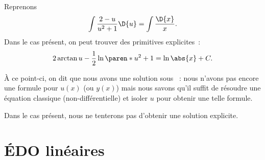 \begin{frame}
  \begin{example}
    Reprenons\pause{}
    \begin{equation*}
      \int \frac{2-u}{u^{2}+1}\D{u} = \int \frac{\D{x}}{x}.
    \end{equation*}\pause{}
    Dans le cas présent, on peut trouver des primitives explicites~:
    \begin{equation*}
      2 \arctan u - \frac{1}{2} \ln{\paren*{u^{2}+1}} = \ln\abs{x} + C.
    \end{equation*}\pause{}

    À ce point-ci, on dit que nous avons une solution sous ~:\pause{} nous n'avons pas encore une formule pour \(u(x)\) (ou \(y(x)\))\pause{} mais nous savons qu'il \og suffit\fg{} de résoudre une équation classique (non-différentielle)\pause{} et isoler \(u\) pour obtenir une telle formule.\pause{}

    Dans le cas présent, nous ne tenterons pas d'obtenir une solution explicite.
  \end{example}
\end{frame}
\section{ÉDO linéaires}
